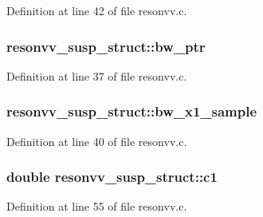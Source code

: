 Definition at line 42 of file resonvv.\+c.

\subsubsection[{\texorpdfstring{bw\+\_\+ptr}{bw_ptr}}]{ resonvv\+\_\+susp\+\_\+struct\+::bw\+\_\+ptr}\hypertarget{structresonvv__susp__struct_a21d93a6a6b3783a5911e914a3334cfef}{}\label{structresonvv__susp__struct_a21d93a6a6b3783a5911e914a3334cfef}


Definition at line 37 of file resonvv.\+c.

\subsubsection[{\texorpdfstring{bw\+\_\+x1\+\_\+sample}{bw_x1_sample}}]{ resonvv\+\_\+susp\+\_\+struct\+::bw\+\_\+x1\+\_\+sample}\hypertarget{structresonvv__susp__struct_a1665c02071bb2cdcc43580ee57632618}{}\label{structresonvv__susp__struct_a1665c02071bb2cdcc43580ee57632618}


Definition at line 40 of file resonvv.\+c.

\subsubsection[{\texorpdfstring{c1}{c1}}]{\setlength{\rightskip}{0pt plus 5cm}double resonvv\+\_\+susp\+\_\+struct\+::c1}\hypertarget{structresonvv__susp__struct_a07ffa92403ff7ad431bcb8728a5dfc57}{}\label{structresonvv__susp__struct_a07ffa92403ff7ad431bcb8728a5dfc57}


Definition at line 55 of file resonvv.\+c.

